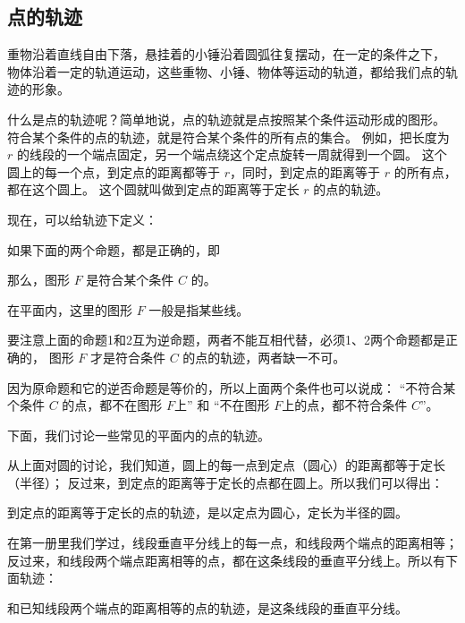 \subsection{点的轨迹}\label{subsec:czjh2-7-22}

重物沿着直线自由下落，悬挂着的小锤沿着圆弧往复摆动，在一定的条件之下，
物体沿着一定的轨道运动，这些重物、小锤、物体等运动的轨道，都给我们点的轨迹的形象。

什么是点的轨迹呢？简单地说，点的轨迹就是点按照某个条件运动形成的图形。
符合某个条件的点的轨迹，就是符合某个条件的所有点的集合。
例如，把长度为 $r$ 的线段的一个端点固定，另一个端点绕这个定点旋转一周就得到一个圆。
这个圆上的每一个点，到定点的距离都等于 $r$，同时，到定点的距离等于 $r$ 的所有点，都在这个圆上。
这个圆就叫做到定点的距离等于定长 $r$ 的点的轨迹。

现在，可以给轨迹下定义：

如果下面的两个命题，都是正确的，即



那么，图形 $F$ 是符合某个条件 $C$ 的。

在平面内，这里的图形 $F$ 一般是指某些线。

要注意上面的命题1和2互为逆命题，两者不能互相代替，必须1、2两个命题都是正确的，
图形 $F$ 才是符合条件 $C$ 的点的轨迹，两者缺一不可。

因为原命题和它的逆否命题是等价的，所以上面两个条件也可以说成：
“不符合某个条件 $C$ 的点，都不在图形 $F$上” 和 “不在图形 $F$上的点，都不符合条件 $C$”。

下面，我们讨论一些常见的平面内的点的轨迹。

从上面对圆的讨论，我们知道，圆上的每一点到定点（圆心）的距离都等于定长（半径）；
反过来，到定点的距离等于定长的点都在圆上。所以我们可以得出：

\begin{xingzhi}[轨迹1]
    到定点的距离等于定长的点的轨迹，是以定点为圆心，定长为半径的圆。
\end{xingzhi}

在第一册里我们学过，线段垂直平分线上的每一点，和线段两个端点的距离相等；
反过来，和线段两个端点距离相等的点，都在这条线段的垂直平分线上。所以有下面轨迹：

\begin{xingzhi}[轨迹2]
    和已知线段两个端点的距离相等的点的轨迹，是这条线段的垂直平分线。
\end{xingzhi}

